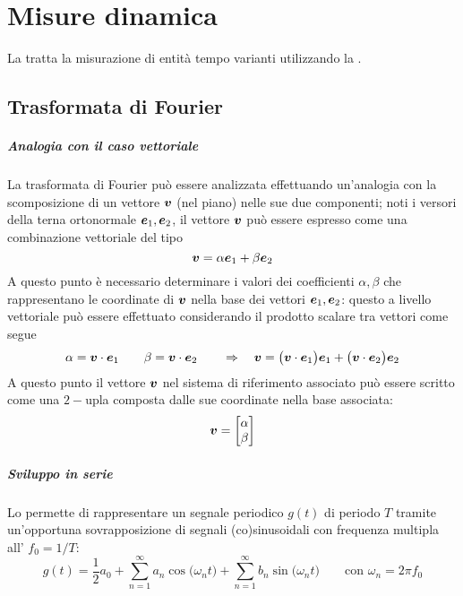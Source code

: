 \chapter{Misure dinamica}
	La  tratta la misurazione di entità tempo varianti utilizzando la .
	
\section{Trasformata di Fourier}
	
	\paragraph{Analogia con il caso vettoriale} La trasformata di Fourier può essere analizzata effettuando un'analogia con la scomposizione di un vettore $\boldsymbol v$ (nel piano) nelle sue due componenti; noti i versori della terna ortonormale $\boldsymbol e_1,\boldsymbol e_2$, il vettore $\boldsymbol v$ può essere espresso come una combinazione vettoriale del tipo
	\begin{equation} \label{eq:four:vettcombinazione}
		\boldsymbol v = \alpha \boldsymbol e_1 + \beta \boldsymbol e_2
	\end{equation}
	A questo punto è necessario determinare i valori dei coefficienti $\alpha,\beta$ che rappresentano le coordinate di $\boldsymbol v$ nella base dei vettori $\boldsymbol e_1,\boldsymbol e_2$: questo a livello vettoriale può essere effettuato considerando il prodotto scalare tra vettori come segue
	\begin{equation} \label{eq:four:vettcoordinate}
		\alpha = \boldsymbol v \cdot \boldsymbol e_1 \qquad \beta = \boldsymbol v \cdot \boldsymbol e_2 \qquad \Rightarrow \quad \boldsymbol v = \big(\boldsymbol v \cdot \boldsymbol e_1\big) \boldsymbol e_1 + \big(\boldsymbol v\cdot \boldsymbol e_2\big) \boldsymbol e_2
	\end{equation}
	A questo punto il vettore $\boldsymbol v$ nel sistema di riferimento associato può essere scritto come una $2-$upla composta dalle sue coordinate nella base associata:
	\begin{equation} \label{eq:four:vettrappresentazione}
		\boldsymbol v = \begin{bmatrix}
			 \alpha \\ \beta
		\end{bmatrix}
	\end{equation}
	
	\paragraph{Sviluppo in serie} Lo  permette di rappresentare un segnale periodico $g(t)$ di periodo $T$ tramite un'opportuna sovrapposizione di segnali (co)sinusoidali con frequenza multipla all' $f_0 = 1/T$:
	\begin{equation} \label{eq:four:serie1}
		g(t) = \frac 1 2 a_0 + \sum_{n=1}^\infty a_n \cos\big(\omega_n t\big) + \sum_{n=1}^\infty b_n\sin\big(\omega_n t\big) \qquad \textrm{con } \omega_n = 2\pi f_0
	\end{equation}
	

